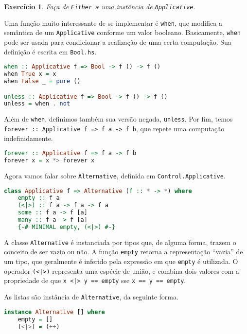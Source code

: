 \documentclass[a4paper]{article}
\newtheorem{exercicio}{Exercício}
\begin{document}
\begin{exercicio}
	Faça de \emph{\texttt{Either a}} uma instância de \emph{\texttt{Applicative}}.
\end{exercicio}

Uma função muito interessante de se implementar é \texttt{when}, que modifica a semântica de um \texttt{Applicative} conforme um valor booleano.
Basicamente, \texttt{when} pode ser usada para condicionar a realização de uma certa computação.
Sua definição é escrita em \texttt{Bool.hs}.

\begin{lstlisting}[language=haskell, frame=single]
when :: Applicative f => Bool -> f () -> f ()
when True x = x
when False _ = pure ()

unless :: Applicative f => Bool -> f () -> f ()
unless = when . not
\end{lstlisting}

Além de \texttt{when}, definimos também sua versão negada, \texttt{unless}.
Por fim, temos \texttt{forever :: Applicative f => f a -> f b}, que repete uma computação indefinidamente.

\begin{lstlisting}[language=haskell, frame=single]
forever :: Applicative f => f a -> f b
forever x = x *> forever x
\end{lstlisting}

Agora vamos falar sobre \texttt{Alternative}, definida em \texttt{Control.Applicative}.

\begin{lstlisting}[language=haskell, frame=single]
class Applicative f => Alternative (f :: * -> *) where
	empty :: f a
	(<|>) :: f a -> f a -> f a
	some :: f a -> f [a]
	many :: f a -> f [a]
	{-# MINIMAL empty, (<|>) #-}
\end{lstlisting}

A classe \texttt{Alternative} é instanciada por tipos que, de alguma forma, trazem o conceito de ser vazio ou não.
A função \texttt{empty} retorna a representação ``vazia'' de um tipo, que geralmente é inferido pela expressão em que \texttt{empty} é utilizada.
O operador \texttt{(<|>)} representa uma espécie de união, e combina dois valores com a propriedade de que \texttt{x <|> y == empty} sse \mbox{\texttt{x == y == empty}}.

As listas são instância de \texttt{Alternative}, da seguinte forma.

\begin{lstlisting}[language=haskell, frame=single]
instance Alternative [] where
	empty = []
	(<|>) = (++)
\end{lstlisting}
\end{document}
